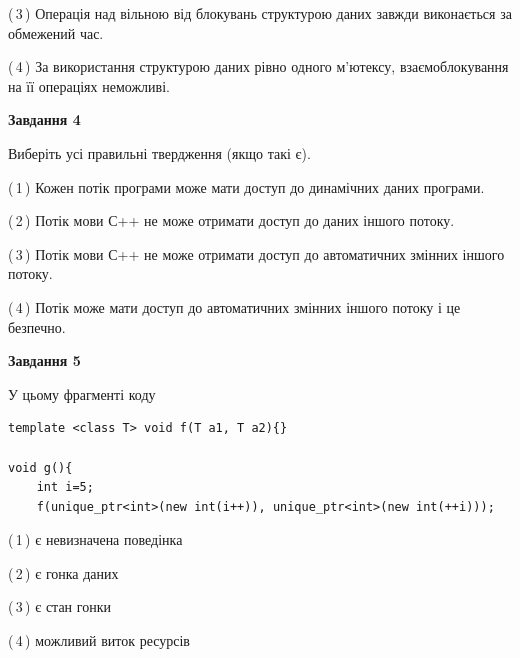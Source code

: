 \documentclass[12pt, ukrainian]{article}
\begin{document}
\begin {large}
{(\,3\,) Операція над вільною від блокувань структурою даних завжди виконається за обмежений час.%

(\,4\,) За використання структурою даних рівно одного м’ютексу, взаємоблокування на її операціях неможливі.%



\begin{center}
\textbf{Завдання 4}
\end{center}
Виберіть усі правильні твердження (якщо такі є).\par
\vspace{2mm}

(\,1\,) Кожен потік програми може мати доступ до динамічних даних програми.%

(\,2\,) Потік мови С++ не може отримати доступ до даних іншого потоку.%

(\,3\,) Потік мови С++ не може отримати доступ до автоматичних змінних іншого потоку.%

(\,4\,) Потік може мати доступ до автоматичних змінних іншого потоку і це безпечно.%



\begin{center}
\textbf{Завдання 5}
\end{center}
У цьому фрагменті коду
\begin{verbatim}
template <class T> void f(T a1, T a2){}

void g(){
    int i=5;
    f(unique_ptr<int>(new int(i++)), unique_ptr<int>(new int(++i)));
\end{verbatim}

(\,1\,) є невизначена поведінка%

(\,2\,) є гонка даних%

(\,3\,) є стан гонки%

(\,4\,) можливий виток ресурсів%


}
\end {large}
\end{document}

